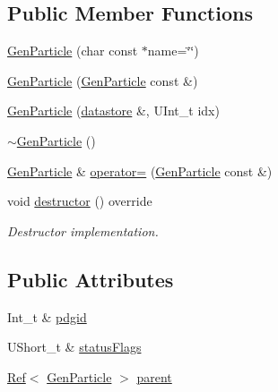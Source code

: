 \subsection*{Public Member Functions}
\begin{DoxyCompactItemize}
\item 
\hyperlink{classpanda_1_1GenParticle_afdb6107d252b4155279305eed77e92f7}{GenParticle} (char const $\ast$name=\char`\"{}\char`\"{})
\item 
\hyperlink{classpanda_1_1GenParticle_aec80c4367bfe4e6113e0a615bc4aa570}{GenParticle} (\hyperlink{classpanda_1_1GenParticle}{GenParticle} const \&)
\item 
\hyperlink{classpanda_1_1GenParticle_a3f40ef5315a59c8f6fe86275c16c73fb}{GenParticle} (\hyperlink{structpanda_1_1Element_1_1datastore}{datastore} \&, UInt\_\-t idx)
\item 
\hyperlink{classpanda_1_1GenParticle_a777f200cb71277187c952281a4994e76}{$\sim$GenParticle} ()
\item 
\hyperlink{classpanda_1_1GenParticle}{GenParticle} \& \hyperlink{classpanda_1_1GenParticle_a46eed568bb72468ccda95c09002ea6a5}{operator=} (\hyperlink{classpanda_1_1GenParticle}{GenParticle} const \&)
\item 
void \hyperlink{classpanda_1_1GenParticle_a3741159cb9918fc4a7bf714995d72469}{destructor} () override
\begin{DoxyCompactList}\small\item\em Destructor implementation. \item\end{DoxyCompactList}\end{DoxyCompactItemize}
\subsection*{Public Attributes}
\begin{DoxyCompactItemize}
\item 
Int\_\-t \& \hyperlink{classpanda_1_1GenParticle_aab60b403c96f228bfabbb5e5c338126b}{pdgid}
\item 
UShort\_\-t \& \hyperlink{classpanda_1_1GenParticle_af2b7ee2bf756391419ab702b7dfd2b3a}{statusFlags}
\item 
\hyperlink{classpanda_1_1Ref}{Ref}$<$ \hyperlink{classpanda_1_1GenParticle}{GenParticle} $>$ \hyperlink{classpanda_1_1GenParticle_a478bb0f7a51e96f83b9593acf76279ca}{parent}
\end{DoxyCompactItemize}
